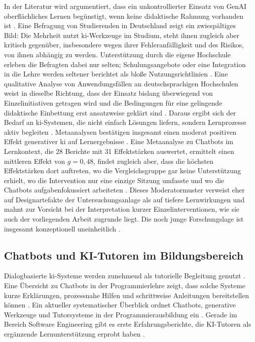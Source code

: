 In der Literatur wird argumentiert, dass ein unkontrollierter Einsatz von GenAI oberflächliches
Lernen begünstigt, wenn keine didaktische Rahmung vorhanden ist \cite{chanComprehensiveAIPolicy2023, hallGenerativeAIReweaving2024, limGenerativeAIFuture2023}.
Eine Befragung von Studierenden in Deutschland zeigt ein zwiespältiges Bild: Die Mehrheit nutzt
\acrshort{ki}-Werkzeuge im Studium, steht ihnen zugleich aber kritisch gegenüber, insbesondere wegen
ihrer Fehleranfälligkeit und des Risikos, von ihnen abhängig zu werden. Unterstützung durch die
eigene Hochschule erleben die Befragten dabei nur selten; Schulungsangebote oder eine Integration in
die Lehre werden seltener berichtet als bloße Nutzungsrichtlinien
\cite{marczukKuenstlicheIntelligenzStudienalltag2025}. Eine qualitative Analyse von
Anwendungsfällen an deutschsprachigen Hochschulen weist in dieselbe Richtung, dass der Einsatz bislang
überwiegend von Einzelinitiativen getragen wird und die Bedingungen für eine gelingende didaktische
Einbettung erst ansatzweise geklärt sind \cite{wannemacherWieKIStudium2025}.
Daraus ergibt sich der Bedarf an \acrshort{ki}-Systemen, die nicht einfach Lösungen liefern,
sondern Lernprozesse aktiv begleiten \cite{francisGenerativeAIHigher2025}. Metaanalysen bestätigen
insgesamt einen moderat positiven Effekt generativer \acrshort{ki} auf Lernergebnisse
\cite{wuChatGPTImpactStudent2026}. Eine Metaanalyse zu Chatbots im Lernkontext, die 28 Berichte mit
31 Effektstärken auswertet, ermittelt einen mittleren Effekt von $g = 0{,}48$, findet zugleich aber,
dass die höchsten Effektstärken dort auftreten, wo die Vergleichsgruppe gar keine Unterstützung
erhielt, wo die Intervention nur eine einzige Sitzung umfasste und wo die Chatbots aufgabenfokussiert
arbeiteten \cite{alemdagEffectChatbotsLearning2023}. Dieses Moderatormuster verweist eher auf
Designartefakte der Untersuchungsanlage als auf tiefere Lernwirkungen und mahnt zur Vorsicht bei der
Interpretation kurzer Einzelinterventionen, wie sie auch der vorliegenden Arbeit zugrunde liegt. Die
noch junge Forschungslage ist insgesamt konzeptionell uneinheitlich
\cite{mcgrathGenerativeAIChatbots2024}.

\newpage
\subsection{Chatbots und KI-Tutoren im Bildungsbereich}

Dialogbasierte \acrshort{ki}-Systeme werden zunehmend als tutorielle Begleitung genutzt \cite{labadzeRoleAIChatbots2023}.
Eine Übersicht zu Chatbots in der Programmierlehre zeigt, dass solche Systeme kurze Erklärungen,
prozessnahe Hilfen und schrittweise Anleitungen bereitstellen können \cite{garciaSystematicMappingStudy2025}.
Ein aktueller systematischer Überblick ordnet Chatbots, generative Werkzeuge und Tutorsysteme in der
Programmierausbildung ein \cite{elnaffarTeachingAISystematic2025}.
Gerade im Bereich Software Engineering gibt es erste Erfahrungsberichte, die KI-Tutoren
als ergänzende Lernunterstützung erprobt haben \cite{frankfordAITutoringSoftwareEngineering2024, happeExperienceReportPedagogically2025, sengulSoftwareEngineeringEducation2024, feinAIDrivenSoftwareDevelopment2026}.

